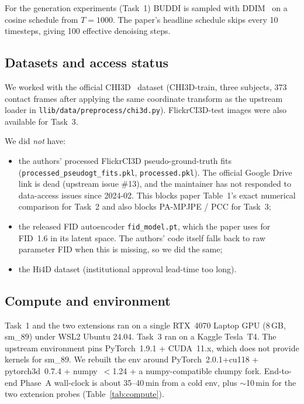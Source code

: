 \documentclass[10pt]{article}
\begin{document}
For the generation experiments (Task~1) BUDDI is sampled with DDIM~\citep{song2021ddim} on a cosine schedule from $T{=}1000$. The paper's headline schedule skips every 10 timesteps, giving 100 effective denoising steps.

\subsection{Datasets and access status}

We worked with the official CHI3D~\citep{fieraru2020chi3d} dataset (CHI3D-train, three subjects, 373 contact frames after applying the same coordinate transform as the upstream loader in \texttt{llib/data/preprocess/chi3d.py}). FlickrCI3D-test images were also available for Task~3.

We did \emph{not} have:
\begin{itemize}
    \item the authors' processed FlickrCI3D pseudo-ground-truth fits (\texttt{processed\_pseudogt\_fits.pkl}, \texttt{processed.pkl}). The official Google Drive link is dead (upstream issue \#13), and the maintainer has not responded to data-access issues since 2024-02. This blocks paper Table~1's exact numerical comparison for Task~2 and also blocks PA-MPJPE / PCC for Task~3;
    \item the released FID autoencoder \texttt{fid\_model.pt}, which the paper uses for FID~1.6 in its latent space. The authors' code itself falls back to raw parameter FID when this is missing, so we did the same;
    \item the Hi4D dataset (institutional approval lead-time too long).
\end{itemize}

\subsection{Compute and environment}

Task~1 and the two extensions ran on a single RTX~4070 Laptop GPU (8\,GB, sm\_89) under WSL2 Ubuntu 24.04. Task~3 ran on a Kaggle Tesla~T4. The upstream environment pins PyTorch~1.9.1 + CUDA~11.x, which does not provide kernels for sm\_89. We rebuilt the env around PyTorch~2.0.1+cu118 + pytorch3d~0.7.4 + numpy~$<$1.24 + a numpy-compatible chumpy fork. End-to-end Phase~A wall-clock is about 35--40\,min from a cold env, plus $\sim$10\,min for the two extension probes (Table~\ref{tab:compute}).
\end{document}
